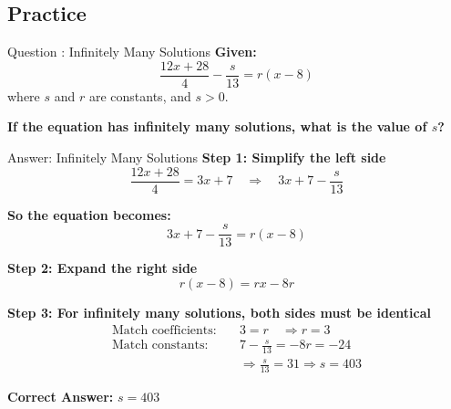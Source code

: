 \documentclass{beamer}
\begin{document}
\begin{frame}
\section{Practice}
\end{frame}

\begin{frame}{Question : Infinitely Many Solutions}
    \textbf{Given:}
    \[
    \frac{12x + 28}{4} - \frac{s}{13} = r(x - 8)
    \]
    where \(s\) and \(r\) are constants, and \(s > 0\).

    \vspace{1em}
    \textbf{If the equation has infinitely many solutions, what is the value of \(s\)?}
\end{frame}

\begin{frame}{Answer: Infinitely Many Solutions}
\small
    \textbf{Step 1: Simplify the left side}
    \[
    \frac{12x + 28}{4} = 3x + 7 \quad \Rightarrow \quad 3x + 7 - \frac{s}{13}
    \]

    \textbf{So the equation becomes:}
    \[
    3x + 7 - \frac{s}{13} = r(x - 8)
    \]

    \textbf{Step 2: Expand the right side}
    \[
    r(x - 8) = rx - 8r
    \]

    \textbf{Step 3: For infinitely many solutions, both sides must be identical}
    \begin{align*}
        \text{Match coefficients:} \quad & 3 = r \quad \Rightarrow r = 3 \\
        \text{Match constants:} \quad & 7 - \frac{s}{13} = -8r = -24  \\
        & \Rightarrow \frac{s}{13} = 31 \Rightarrow s = 403
    \end{align*}

    \textbf{Correct Answer:} \( \boxed{s = 403} \)
\end{frame}
\end{document}
